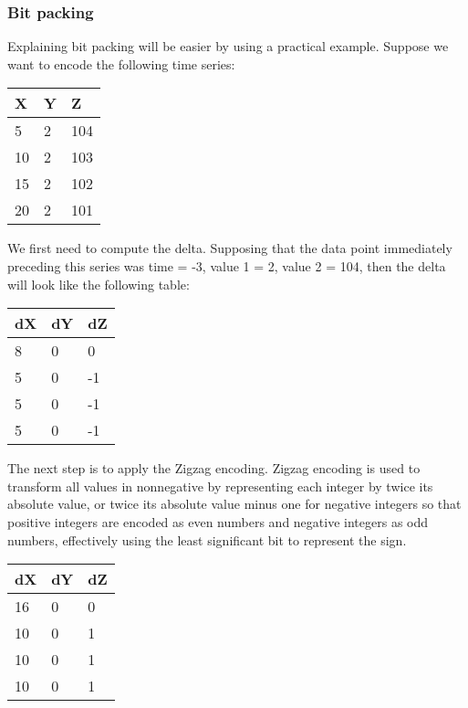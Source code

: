\subsubsection{Bit packing}
Explaining bit packing will be easier by using a practical example. Suppose we want to encode
the following time series:
\begin{table}[!htbp]
\centering
\begin{tabular}{l|l|l}
\textbf{X} & \textbf{Y} & \textbf{Z} \\ 
\hline
5  & 2 & 104 \\
10 & 2 & 103 \\
15 & 2 & 102 \\
20 & 2 & 101 \\
\end{tabular}
\end{table}

We first need to compute the delta. Supposing that the data point immediately preceding
this series was time = -3, value 1 = 2, value 2 = 104, then the delta will look like the
following table:
\begin{table}[!htbp]
\centering
\begin{tabular}{l|l|l}
\textbf{dX} & \textbf{dY} & \textbf{dZ} \\ 
\hline
8 & 0 &  0 \\
5 & 0 & -1 \\
5 & 0 & -1 \\
5 & 0 & -1 \\
\end{tabular}
\end{table}

The next step is to apply the Zigzag encoding. Zigzag encoding is used to transform all
values in nonnegative by representing each integer by twice its absolute value, or twice
its absolute value minus one for negative integers so that positive integers are encoded
as even numbers and negative integers as odd numbers, effectively using the least significant
bit to represent the sign.
\begin{table}[!htbp]
\centering
\begin{tabular}{l|l|l}
\textbf{dX} & \textbf{dY} & \textbf{dZ} \\ 
\hline
16 & 0 &  0 \\
10 & 0 &  1 \\
10 & 0 &  1 \\
10 & 0 &  1 \\
\end{tabular}
\end{table}

